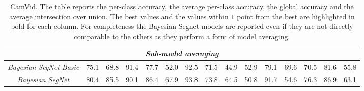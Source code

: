 \begin{table}[t]
{{\begin{tabular}{c|c|c|c|c|c|c|c|c|c|c|c||c|c|c}
				\multicolumn{15}{c}{\emph{Sub-model averaging}} \\ \hline
                \emph{Bayesian SegNet-Basic} \cite{Kendall2015bayesiansegnet} & 75.1 & 68.8 & 91.4 & 77.7 & 52.0 & 92.5 & 71.5 & 44.9 & 52.9 & 79.1 & 69.6 & 70.5 & 81.6 & 55.8 \\ \hline
                \emph{Bayesian SegNet} \cite{Kendall2015bayesiansegnet} & 80.4 & 85.5 & 90.1 & 86.4 & 67.9 & 93.8 & 73.8 & 64.5 & 50.8 & 91.7 & 54.6 & 76.3 & 86.9 & 63.1 \\ \hline

			\end{tabular}
		}
    }
	\vspace*{0.1cm}
    \caption{%
        CamVid. The table reports the per-class accuracy, the average per-class
        accuracy, the global accuracy and the average intersection over union.
        The best values and the values within $1$ point from the best are
        highlighted in bold for each column. For completeness the Bayesian
        Segnet models are reported even if they are not directly comparable to
        the others as they perform a form of model averaging.}
    \label{tbl:camvid_SOTA}
\end{table}

